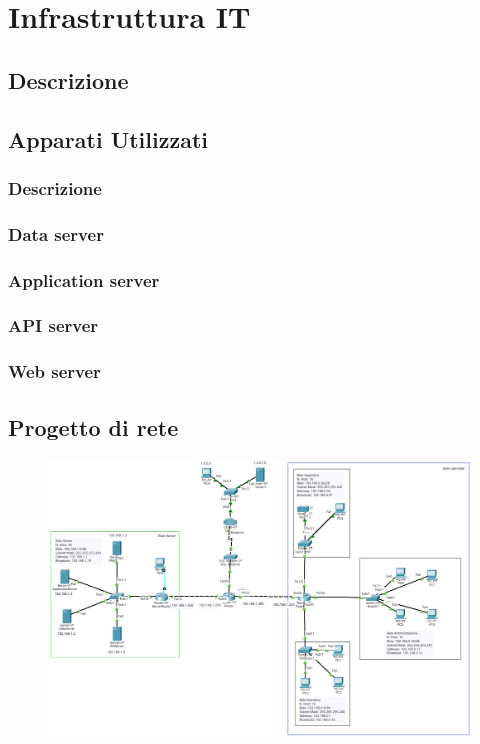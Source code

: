 \section{Infrastruttura IT}
\subsection{Descrizione}
\subsection{Apparati Utilizzati}
\subsubsection{Descrizione}
\subsubsection{Data server}
\subsubsection{Application server}
\subsubsection{API server}
\subsubsection{Web server}
\subsection{Progetto di rete}
\begin{figure}
    \includegraphics[scale=.5]{images/rete.png}
\end{figure}